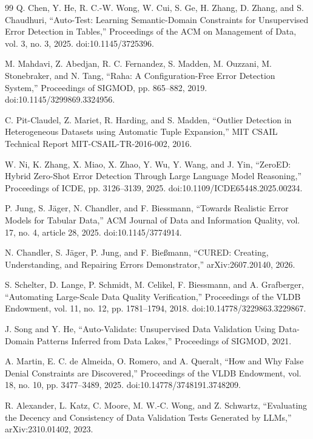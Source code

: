\documentclass[11pt,a4paper]{article}
\begin{document}
\begin{thebibliography}{99}
 Q. Chen, Y. He, R. C.-W. Wong, W. Cui, S. Ge, H. Zhang, D. Zhang, and S. Chaudhuri, ``Auto-Test: Learning Semantic-Domain Constraints for Unsupervised Error Detection in Tables,'' Proceedings of the ACM on Management of Data, vol. 3, no. 3, 2025. doi:10.1145/3725396.

 M. Mahdavi, Z. Abedjan, R. C. Fernandez, S. Madden, M. Ouzzani, M. Stonebraker, and N. Tang, ``Raha: A Configuration-Free Error Detection System,'' Proceedings of SIGMOD, pp. 865--882, 2019. doi:10.1145/3299869.3324956.

 C. Pit-Claudel, Z. Mariet, R. Harding, and S. Madden, ``Outlier Detection in Heterogeneous Datasets using Automatic Tuple Expansion,'' MIT CSAIL Technical Report MIT-CSAIL-TR-2016-002, 2016.

 W. Ni, K. Zhang, X. Miao, X. Zhao, Y. Wu, Y. Wang, and J. Yin, ``ZeroED: Hybrid Zero-Shot Error Detection Through Large Language Model Reasoning,'' Proceedings of ICDE, pp. 3126--3139, 2025. doi:10.1109/ICDE65448.2025.00234.

 P. Jung, S. J\"ager, N. Chandler, and F. Biessmann, ``Towards Realistic Error Models for Tabular Data,'' ACM Journal of Data and Information Quality, vol. 17, no. 4, article 28, 2025. doi:10.1145/3774914.

 N. Chandler, S. J\"ager, P. Jung, and F. Bie{\ss}mann, ``CURED: Creating, Understanding, and Repairing Errors Demonstrator,'' arXiv:2607.20140, 2026.

 S. Schelter, D. Lange, P. Schmidt, M. Celikel, F. Biessmann, and A. Grafberger, ``Automating Large-Scale Data Quality Verification,'' Proceedings of the VLDB Endowment, vol. 11, no. 12, pp. 1781--1794, 2018. doi:10.14778/3229863.3229867.

 J. Song and Y. He, ``Auto-Validate: Unsupervised Data Validation Using Data-Domain Patterns Inferred from Data Lakes,'' Proceedings of SIGMOD, 2021.

 A. Martin, E. C. de Almeida, O. Romero, and A. Queralt, ``How and Why False Denial Constraints are Discovered,'' Proceedings of the VLDB Endowment, vol. 18, no. 10, pp. 3477--3489, 2025. doi:10.14778/3748191.3748209.

 R. Alexander, L. Katz, C. Moore, M. W.-C. Wong, and Z. Schwartz, ``Evaluating the Decency and Consistency of Data Validation Tests Generated by LLMs,'' arXiv:2310.01402, 2023.


\end{thebibliography}
\end{document}
